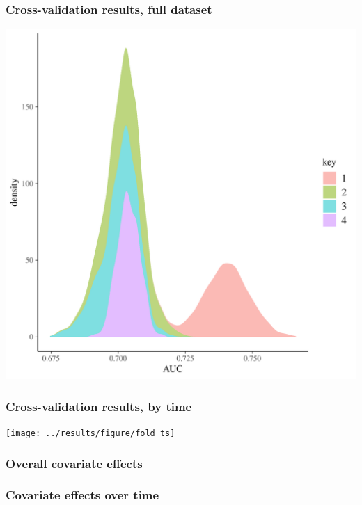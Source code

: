 \documentclass{beamer}
\begin{document}
\begin{frame}
  \frametitle{Cross-validation results, full dataset}
      
  \includegraphics[width=\textwidth,height=\textheight,keepaspectratio=true]{../results/figure/fold_auc}

\end{frame}

\begin{frame}
  \frametitle{Cross-validation results, by time}
  
  \texttt{[image: ../results/figure/fold\_ts]}

\end{frame}


\begin{frame}
  \frametitle{Overall covariate effects}  

\end{frame}


\begin{frame}
  \frametitle{Covariate effects over time}  

\end{frame}
\end{document}
